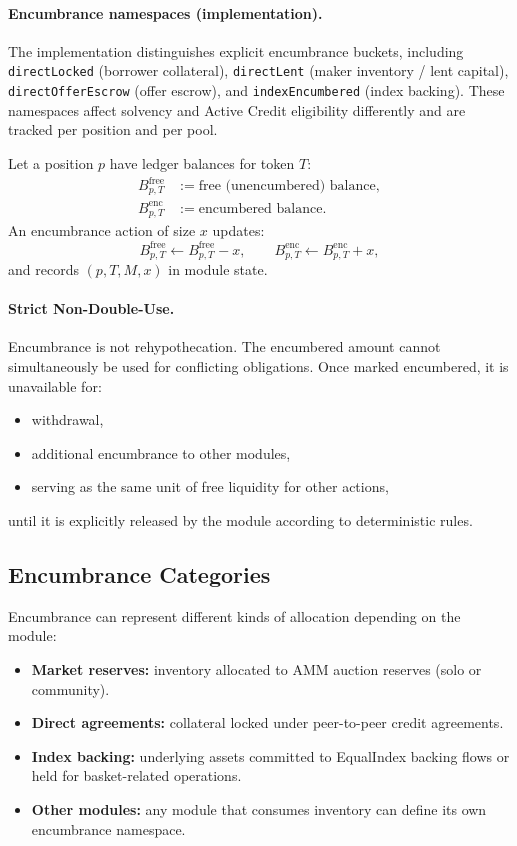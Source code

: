 \documentclass[version=preprint]{iacrcc}
\begin{document}
\paragraph{Encumbrance namespaces (implementation).}
The implementation distinguishes explicit encumbrance buckets, including \texttt{directLocked} (borrower collateral), \texttt{directLent} (maker inventory / lent capital), \texttt{directOfferEscrow} (offer escrow), and \texttt{indexEncumbered} (index backing). These namespaces affect solvency and Active Credit eligibility differently and are tracked per position and per pool.

Let a position $p$ have ledger balances for token $T$:
\begin{align*}
B^{\text{free}}_{p,T} &:= \text{free (unencumbered) balance}, \\
B^{\text{enc}}_{p,T}  &:= \text{encumbered balance}.
\end{align*}
An encumbrance action of size $x$ updates:
\[
B^{\text{free}}_{p,T} \leftarrow B^{\text{free}}_{p,T} - x,
\qquad
B^{\text{enc}}_{p,T} \leftarrow B^{\text{enc}}_{p,T} + x,
\]
and records $(p, T, M, x)$ in module state.

\paragraph{Strict Non-Double-Use.}
Encumbrance is not rehypothecation. The encumbered amount cannot simultaneously be used for conflicting obligations. Once marked encumbered, it is unavailable for:
\begin{itemize}
  \item withdrawal,
  \item additional encumbrance to other modules,
  \item serving as the same unit of free liquidity for other actions,
\end{itemize}
until it is explicitly released by the module according to deterministic rules.

\subsection{Encumbrance Categories}

Encumbrance can represent different kinds of allocation depending on the module:
\begin{itemize}
  \item \textbf{Market reserves:} inventory allocated to AMM auction reserves (solo or community).
  \item \textbf{Direct agreements:} collateral locked under peer-to-peer credit agreements.
  \item \textbf{Index backing:} underlying assets committed to EqualIndex backing flows or held for basket-related operations.
  \item \textbf{Other modules:} any module that consumes inventory can define its own encumbrance namespace.
\end{itemize}
\end{document}
